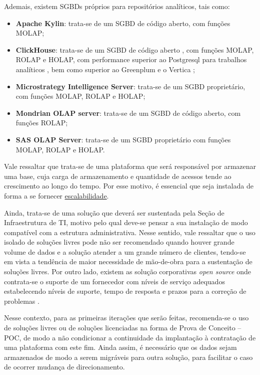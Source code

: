 Ademais, existem SGBDs próprios para repositórios analíticos, tais como:
\begin{itemize}
    \item \textbf{Apache Kylin}: trata-se de um SGBD de código aberto, com funções MOLAP;
    \item \textbf{ClickHouse}: trata-se de um SGBD de código aberto \cite{clickhouse}, com funções MOLAP, ROLAP e HOLAP, com performance superior ao Postgresql para trabalhos analíticos \cite{benchpostgre}, bem como superior ao Greenplum e o Vertica \cite{benchclickhouse};
    \item \textbf{Microstrategy Intelligence Server}: trata-se de um SGBD proprietário, com funções MOLAP, ROLAP e HOLAP;
    \item \textbf{Mondrian OLAP server}: trata-se de um SGBD de código aberto, com funções ROLAP;
    \item \textbf{SAS OLAP Server}: trata-se de um SGBD proprietário com funções MOLAP, ROLAP e HOLAP.
\end{itemize}

Vale ressaltar que trata-se de uma plataforma que será responsável por armazenar uma base, cuja carga de armazenamento e quantidade de acessos tende ao crescimento ao longo do tempo. Por esse motivo, é essencial que seja instalada de forma a se fornecer \hyperref[sec-escalabilidade]{escalabilidade}.

Ainda, trata-se de uma solução que deverá ser sustentada pela Seção de Infraestrutura de TI, motivo pelo qual deve-se pensar a sua instalação de modo compatível com a estrutura administrativa. Nesse sentido, vale ressaltar que o uso isolado de soluções livres pode não ser recomendado quando houver grande volume de dados e a solução atender a um grande número de clientes, tendo-se em vista a tendência de maior necessidade de mão-de-obra para a sustentação de soluções livres. Por outro lado, existem as solução corporativas \emph{open source} onde contrata-se o suporte de um fornecedor com níveis de serviço adequados estabelecendo níveis de suporte, tempo de resposta e prazos para a correção de problemas \cite{enterpriseopensource}.

Nesse contexto, para as primeiras iterações que serão feitas, recomenda-se o uso de soluções livres ou de soluções licenciadas na forma de Prova de Conceito -- POC, de modo a não condicionar a continuidade da implantação à contratação de uma plataforma com este fim. Ainda assim, é necessário que os dados sejam armazenados de modo a serem migráveis para outra solução, para facilitar o caso de ocorrer mudança de direcionamento.

